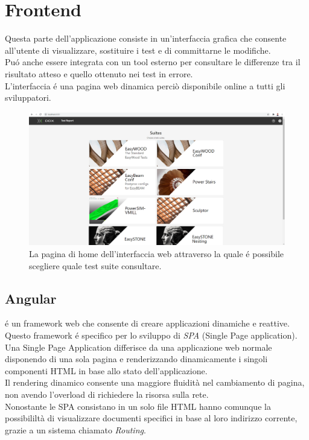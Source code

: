 \chapter{Frontend}
    Questa parte dell'applicazione consiste in un'interfaccia grafica che consente all'utente di visualizzare, sostituire i test e di committarne le modifiche.\\
    Pu\'o anche essere integrata con un tool esterno per consultare le differenze tra il risultato atteso e quello ottenuto nei test in errore.\\
    L'interfaccia \'e una pagina web dinamica perciò disponibile online a tutti gli sviluppatori.\\
    \begin{figure}[h]
        \includegraphics[width=\textwidth]{images/homepage.png}
        \caption{La pagina di home dell'interfaccia web attraverso la quale \'e possibile scegliere quale test suite consultare.}
    \end{figure}
    \section{Angular}
        \cite{Angular} \'e un framework web che consente di creare applicazioni dinamiche e reattive.    \\
        Questo framework \'e specifico per lo sviluppo di \textit{SPA} (Single Page application).\\
        Una Single Page Application differisce da una applicazione web normale disponendo di una sola pagina e renderizzando dinamicamente i singoli componenti HTML in base allo stato dell'applicazione.\\
        Il rendering dinamico consente una maggiore fluidità nel cambiamento di pagina, non avendo l'overload di richiedere la risorsa sulla rete.\\
        Nonostante le SPA consistano in un solo file HTML hanno comunque la possibililtà di visualizzare documenti specifici in base al loro indirizzo corrente, grazie a un sistema chiamato \textit{Routing}. \\
